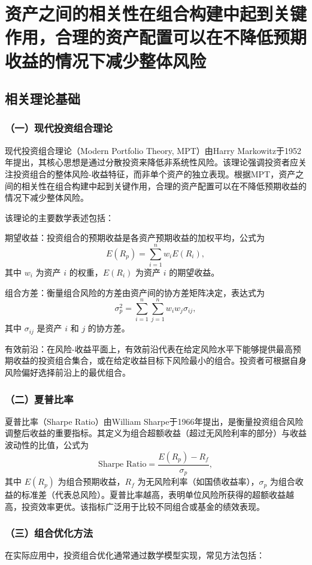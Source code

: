 \chapter{资产之间的相关性在组合构建中起到关键作用，合理的资产配置可以在不降低预期收益的情况下减少整体风险}
\label{appendix:BH}

\section*{相关理论基础}

\subsection*{（一）现代投资组合理论}
现代投资组合理论（Modern Portfolio Theory, MPT）由Harry Markowitz于1952年提出，其核心思想是通过分散投资来降低非系统性风险。该理论强调投资者应关注投资组合的整体风险-收益特征，而非单个资产的独立表现。根据MPT，资产之间的相关性在组合构建中起到关键作用，合理的资产配置可以在不降低预期收益的情况下减少整体风险。

该理论的主要数学表述包括：

期望收益：投资组合的预期收益是各资产预期收益的加权平均，公式为
$$E(R_p) = \sum_{i=1}^n w_iE(R_i),$$
其中 \( w_i \) 为资产 \( i \) 的权重，\( E(R_i) \) 为资产 \( i \) 的期望收益。

组合方差：衡量组合风险的方差由资产间的协方差矩阵决定，表达式为
$$\sigma_p^2 = \sum_{i=1}^n\sum_{j=1}^n w_iw_j\sigma_{ij},$$
其中 \( \sigma_{ij} \) 是资产 \( i \) 和 \( j \) 的协方差。

有效前沿：在风险-收益平面上，有效前沿代表在给定风险水平下能够提供最高预期收益的投资组合集合，或在给定收益目标下风险最小的组合。投资者可根据自身风险偏好选择前沿上的最优组合。

\subsection*{（二）夏普比率}
夏普比率（Sharpe Ratio）由William Sharpe于1966年提出，是衡量投资组合风险调整后收益的重要指标。其定义为组合超额收益（超过无风险利率的部分）与收益波动性的比值，公式为
$$\text{Sharpe Ratio} = \frac{E(R_p) - R_f}{\sigma_p},$$
其中 \( E(R_p) \) 为组合预期收益，\( R_f \) 为无风险利率（如国债收益率），\( \sigma_p \) 为组合收益的标准差（代表总风险）。夏普比率越高，表明单位风险所获得的超额收益越高，投资效率更优。该指标广泛用于比较不同组合或基金的绩效表现。

\subsection*{（三）组合优化方法}
在实际应用中，投资组合优化通常通过数学模型实现，常见方法包括：

